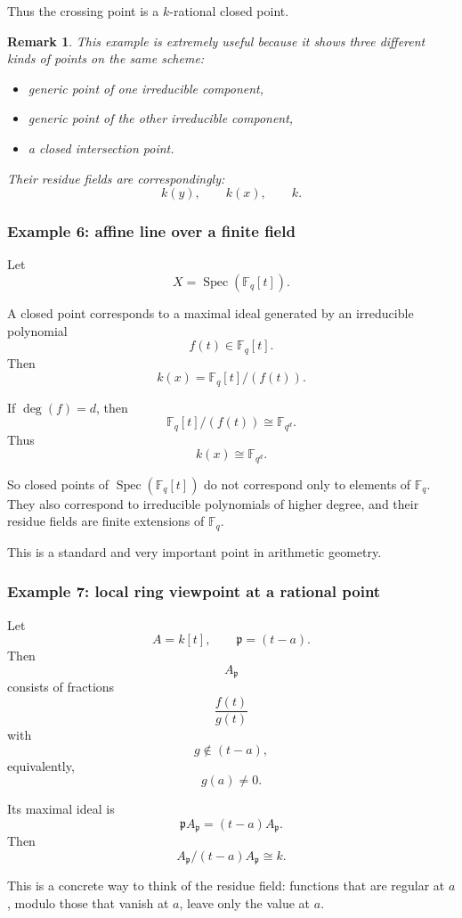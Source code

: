 \documentclass[12pt,a4paper]{article}
\theoremstyle{notespace}
\newtheorem{remark}{Remark}[section]
\newcommand{\Spec}{\operatorname{Spec}}
\newcommand{\F}{\mathbb F}
\newcommand{\p}{\mathfrak p}
\theoremstyle{definition}
\begin{document}
Thus the crossing point is a \(k\)-rational closed point.

\begin{remark}
	This example is extremely useful because it shows three different kinds of points on the same scheme:
	\begin{itemize}[leftmargin=2em]
		\item generic point of one irreducible component,
		\item generic point of the other irreducible component,
		\item a closed intersection point.
	\end{itemize}
	Their residue fields are correspondingly:
	\[
	k(y),\qquad k(x),\qquad k.
	\]
\end{remark}

\subsubsection{Example 6: affine line over a finite field}

Let
\[
X=\Spec(\F_q[t]).
\]

A closed point corresponds to a maximal ideal generated by an irreducible polynomial
\[
f(t)\in \F_q[t].
\]
Then
\[
k(x)=\F_q[t]/(f(t)).
\]

If \(\deg(f)=d\), then
\[
\F_q[t]/(f(t))\cong \F_{q^d}.
\]
Thus
\[
k(x)\cong \F_{q^d}.
\]

So closed points of \(\Spec(\F_q[t])\) do not correspond only to elements of \(\F_q\).  
They also correspond to irreducible polynomials of higher degree, and their residue fields are finite extensions of \(\F_q\).

This is a standard and very important point in arithmetic geometry.

\subsubsection{Example 7: local ring viewpoint at a rational point}

Let
\[
A=k[t],\qquad \p=(t-a).
\]
Then
\[
A_{\p}
\]
consists of fractions
\[
\frac{f(t)}{g(t)}
\]
with
\[
g\notin (t-a),
\]
equivalently,
\[
g(a)\neq 0.
\]

Its maximal ideal is
\[
\p A_{\p}=(t-a)A_{\p}.
\]
Then
\[
A_{\p}/(t-a)A_{\p}\cong k.
\]

This is a concrete way to think of the residue field: functions that are regular at \(a\), modulo those that vanish at \(a\), leave only the value at \(a\).
\end{document}
